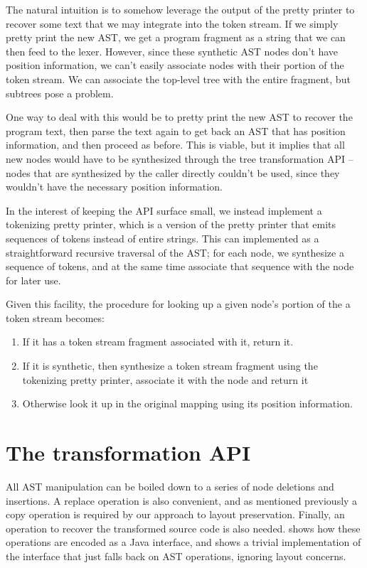 The natural intuition is to somehow leverage the output of the pretty printer
to recover some text that we may integrate into the token stream. If we simply
pretty print the new AST, we get a program fragment as a string that we can
then feed to the lexer. However, since these synthetic AST nodes don't have
position information, we can't easily associate nodes with their portion of the
token stream. We can associate the top-level tree with the entire fragment, but
subtrees pose a problem.

One way to deal with this would be to pretty print the new AST to recover the
program text, then parse the text again to get back an AST that has position
information, and then proceed as before. This is viable, but it implies that
all new nodes would have to be synthesized through the tree transformation API
-- nodes that are synthesized by the caller directly couldn't be used, since
they wouldn't have the necessary position information.

In the interest of keeping the API surface small, we instead implement a
tokenizing pretty printer, which is a version of the pretty printer that emits
sequences of tokens instead of entire strings. This can implemented as a
straightforward recursive traversal of the AST; for each node, we synthesize a
sequence of tokens, and at the same time associate that sequence with the node
for later use.

Given this facility, the procedure for looking up a given node's portion of the
a token stream becomes:

\begin{enumerate}
  \item If it has a token stream fragment associated with it, return it.
  \item If it is synthetic, then synthesize a token stream fragment using the
  tokenizing pretty printer, associate it with the node and return it
  \item Otherwise look it up in the original mapping using its position information.
\end{enumerate}

\section{The transformation API}

All AST manipulation can be boiled down to a series of node deletions and
insertions.  A replace operation is also convenient, and as mentioned
previously a copy operation is required by our approach to layout preservation.
Finally, an operation to recover the transformed source code is also needed.
 shows how these operations are encoded as a Java
interface, and  shows a trivial implementation of
the interface that just falls back on AST operations, ignoring layout concerns.


